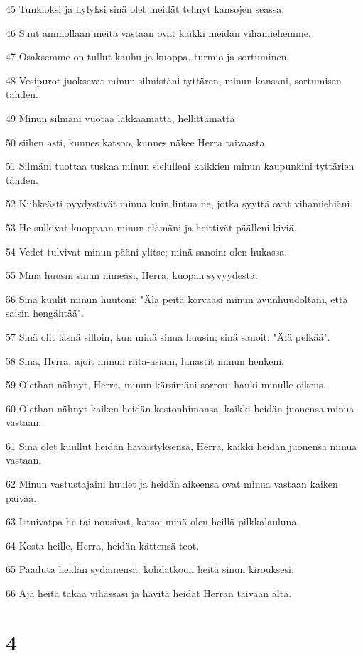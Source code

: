 \par 45 Tunkioksi ja hylyksi sinä olet meidät tehnyt kansojen seassa.
\par 46 Suut ammollaan meitä vastaan ovat kaikki meidän vihamiehemme.
\par 47 Osaksemme on tullut kauhu ja kuoppa, turmio ja sortuminen.
\par 48 Vesipurot juoksevat minun silmistäni tyttären, minun kansani, sortumisen tähden.
\par 49 Minun silmäni vuotaa lakkaamatta, hellittämättä
\par 50 siihen asti, kunnes katsoo, kunnes näkee Herra taivaasta.
\par 51 Silmäni tuottaa tuskaa minun sielulleni kaikkien minun kaupunkini tyttärien tähden.
\par 52 Kiihkeästi pyydystivät minua kuin lintua ne, jotka syyttä ovat vihamiehiäni.
\par 53 He sulkivat kuoppaan minun elämäni ja heittivät päälleni kiviä.
\par 54 Vedet tulvivat minun pääni ylitse; minä sanoin: olen hukassa.
\par 55 Minä huusin sinun nimeäsi, Herra, kuopan syvyydestä.
\par 56 Sinä kuulit minun huutoni: "Älä peitä korvaasi minun avunhuudoltani, että saisin hengähtää".
\par 57 Sinä olit läsnä silloin, kun minä sinua huusin; sinä sanoit: "Älä pelkää".
\par 58 Sinä, Herra, ajoit minun riita-asiani, lunastit minun henkeni.
\par 59 Olethan nähnyt, Herra, minun kärsimäni sorron: hanki minulle oikeus.
\par 60 Olethan nähnyt kaiken heidän kostonhimonsa, kaikki heidän juonensa minua vastaan.
\par 61 Sinä olet kuullut heidän häväistyksensä, Herra, kaikki heidän juonensa minua vastaan.
\par 62 Minun vastustajaini huulet ja heidän aikeensa ovat minua vastaan kaiken päivää.
\par 63 Istuivatpa he tai nousivat, katso: minä olen heillä pilkkalauluna.
\par 64 Kosta heille, Herra, heidän kättensä teot.
\par 65 Paaduta heidän sydämensä, kohdatkoon heitä sinun kirouksesi.
\par 66 Aja heitä takaa vihassasi ja hävitä heidät Herran taivaan alta.

\chapter{4}

